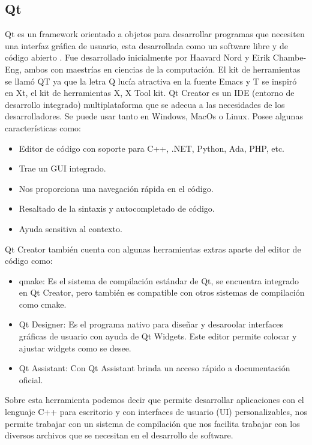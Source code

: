 \documentclass[conference]{IEEEtran}
\newcommand\tab[1][1cm]{\hspace*{#1}}
\begin{document}
    \subsection{Qt}
    
    Qt es un framework orientado a objetos para desarrollar programas que necesiten una interfaz gráfica de usuario, esta desarrollada como un software libre y de código abierto \citep{qtframework} \citep{qt}.
    \newline
    \newline
    \tab[0.55cm] Fue desarrollado inicialmente por Haavard Nord y Eirik Chambe-Eng, ambos con maestrías en ciencias de la computación. El kit de herramientas se llamó QT ya que la letra Q lucía atractiva en la fuente Emacs y T se inspiró en Xt, el kit de herramientas X, X Tool kit.
    \newline
    \newline
    \tab[0.55cm] Qt Creator es un IDE (entorno de desarrollo integrado) multiplataforma que se adecua a las necesidades de los desarrolladores. Se puede usar tanto en Windows, MacOs o Linux.
    \newline
    \tab[0.55cm] Posee algunas características como:
    \begin{itemize}
        \item Editor de código con soporte para C++, .NET, Python, Ada, PHP, etc.
        \item Trae un GUI integrado.
        \item Nos proporciona una navegación rápida en el código.
        \item Resaltado de la sintaxis y autocompletado de código.
        \item Ayuda sensitiva al contexto.
    \end{itemize}
    \newline
    \newline
    \tab[0.55cm] Qt Creator también cuenta con algunas herramientas extras aparte del editor de código como:
    \begin{itemize}
        \item qmake: Es el sistema de compilación estándar de Qt, se encuentra integrado en Qt Creator, pero también es compatible con otros sistemas de compilación como cmake.
        \item Qt Designer: Es el programa nativo para diseñar y desaroolar interfaces gráficas de usuario con ayuda de Qt Widgets. Este editor permite colocar y ajustar widgets como se desee.
        \item Qt Assistant: Con Qt Assistant brinda un acceso rápido a documentación oficial.
    \end{itemize}
    \newline
    \newline
    \tab[0.55cm] Sobre esta herramienta podemos decir que permite desarrollar aplicaciones con el lenguaje C++ para escritorio y con interfaces de usuario (UI) personalizables, nos permite trabajar con un sistema de compilación que nos facilita trabajar con los diversos archivos que se necesitan en el desarrollo de software. 
\end{document}
